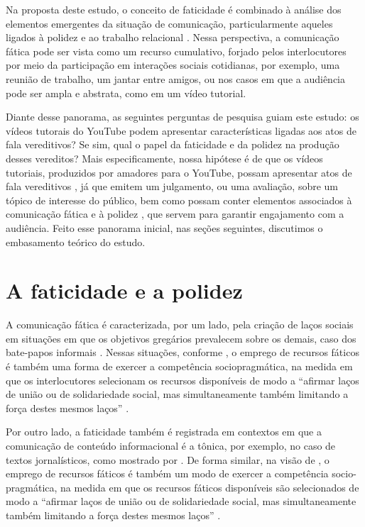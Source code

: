 \documentclass[portuguese]{textolivre}
\begin{document}
Na proposta deste estudo, o conceito de faticidade é combinado à análise dos elementos emergentes da situação de comunicação, particularmente aqueles ligados à polidez e ao trabalho relacional \cite{locher2005,miller2008}. Nessa perspectiva, a comunicação fática pode ser vista como um recurso cumulativo, forjado pelos interlocutores por meio da participação em interações sociais cotidianas, por exemplo, uma reunião de trabalho, um jantar entre amigos, ou nos casos em que a audiência pode ser ampla e abstrata, como em um vídeo tutorial. 

Diante desse panorama, as seguintes perguntas de pesquisa guiam este estudo: os vídeos tutorais do YouTube podem apresentar características ligadas aos atos de fala vereditivos? Se sim, qual o papel da faticidade e da polidez na produção desses vereditos? Mais especificamente, nossa hipótese é de que os vídeos tutoriais, produzidos por amadores para o YouTube, possam apresentar atos de fala vereditivos \cite{austin1975,labinza2021}, já que emitem um julgamento, ou uma avaliação, sobre um tópico de interesse do público, bem como possam conter elementos associados à comunicação fática \cite{yus2019,zuckerman2016} e à polidez \cite{locher2006,miller2008}, que servem para garantir engajamento com a audiência. 
 Feito esse panorama inicial, nas seções seguintes, discutimos o embasamento teórico do estudo.


\section{A faticidade e a polidez}\label{sec-conduta}

A comunicação fática é caracterizada, por um lado, pela criação de laços sociais em situações em que os objetivos gregários prevalecem sobre os demais, caso dos bate-papos informais \cite{coupland2010other, mccarthy2009}. Nessas situações, conforme \cite{laver1975}, o emprego de recursos fáticos é também uma forma de exercer a competência sociopragmática, na medida em que os interlocutores selecionam os recursos disponíveis de modo a “afirmar laços de união ou de solidariedade social, mas simultaneamente também limitando a força destes mesmos laços” \cite[p. 225]{laver1975}.

 Por outro lado, a faticidade também é registrada em contextos em que a comunicação de conteúdo informacional é a tônica, por exemplo, no caso de textos jornalísticos, como mostrado por \textcite{hazaparu2015}. De forma similar, na visão de \cite{laver1975}, o emprego de recursos fáticos é também um modo de exercer a competência socio-pragmática, na medida em que os recursos fáticos disponíveis são selecionados de modo a “afirmar laços de união ou de solidariedade social, mas simultaneamente também limitando a força destes mesmos laços” \cite[p. 225]{laver1975}.
 
\end{document}
